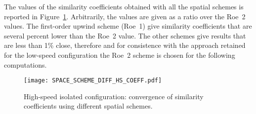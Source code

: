 The values of the similarity coefficients obtained with
all the spatial schemes is reported in 
Figure~\ref{fig:dream_hs_space_scheme_coeff}. Arbitrarily, the values are
given as a ratio over the Roe~2 values. The first-order
upwind scheme (Roe~1) give similarity coefficients that are
several percent lower than the Roe~2 value. The other schemes
give results that are less than 1\% close, therefore and for
consistence with the approach retained for the low-speed configuration
the Roe~2 scheme is chosen for the following computations.
\begin{figure}[htp]
  \centering
  \texttt{[image: SPACE\_SCHEME\_DIFF\_HS\_COEFF.pdf]}
  \caption{High-speed isolated configuration: convergence of 
  similarity coefficients using different spatial schemes.}
  \label{fig:dream_hs_space_scheme_coeff}
\end{figure}

